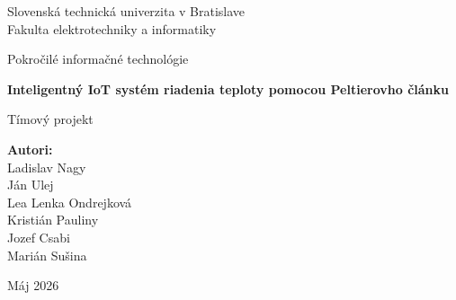 \begin{titlepage}
\centering

{\Large Slovenská technická univerzita v Bratislave}\\
{\Large Fakulta elektrotechniky a informatiky}

\vfill

{\LARGE Pokročilé informačné technológie}

\vspace{0.5cm}

{\Large \textbf{Inteligentný IoT systém riadenia teploty pomocou Peltierovho článku}}

\vspace{0.5cm}

{\Large Tímový projekt}

\vfill

\begin{flushleft}
\textbf{Autori:}\\
Ladislav Nagy\\
Ján Ulej\\
Lea Lenka Ondrejková\\
Kristián Pauliny\\
Jozef Csabi\\
Marián Sušina

\vspace{1cm}

Máj 2026
\end{flushleft}

\end{titlepage}